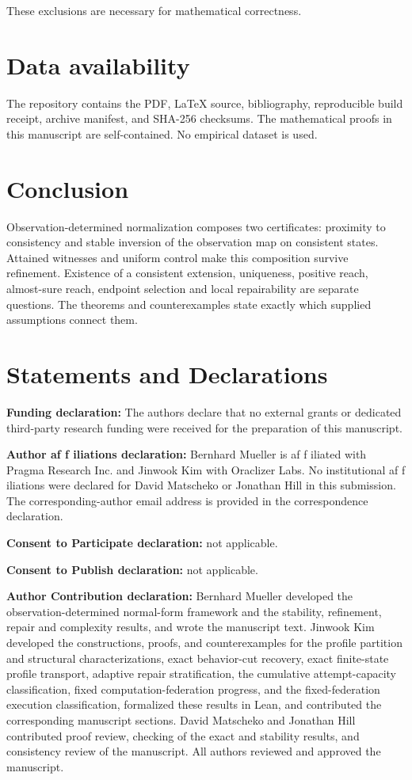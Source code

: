 \documentclass[11pt]{article}
\theoremstyle{definition}
\theoremstyle{remark}
\numberwithin{equation}{section}
\begin{document}
These exclusions are necessary for mathematical correctness.

\section{Data availability}\label{sec:availability}
The repository contains the PDF, LaTeX source, bibliography, reproducible build
receipt, archive manifest, and SHA-256 checksums. The mathematical proofs in
this manuscript are self-contained. No empirical dataset is used.

\section{Conclusion}

Observation-determined normalization composes two certificates: proximity
to consistency and stable inversion of the observation map on consistent
states. Attained witnesses and uniform control make this composition
survive refinement. Existence of a consistent extension, uniqueness,
positive reach, almost-sure reach, endpoint selection and local
repairability are separate questions. The theorems and counterexamples
state exactly which supplied assumptions connect them.

\section*{Statements and Declarations}

\noindent\textbf{Funding declaration:} The authors declare that no external grants or dedicated
third-party research funding were received for the preparation of this manuscript.

\noindent\textbf{Author af\kern0pt f\kern0pt iliations declaration:} Bernhard Mueller is af\kern0pt f\kern0pt iliated with
Pragma Research Inc. and Jinwook Kim with Oraclizer Labs. No institutional
af\kern0pt f\kern0pt iliations were declared for David Matscheko or
Jonathan Hill in this submission. The corresponding-author email address is provided in the
correspondence declaration.

\noindent\textbf{Consent to Participate declaration:} not applicable.

\noindent\textbf{Consent to Publish declaration:} not applicable.

\noindent\textbf{Author Contribution declaration:} Bernhard Mueller developed the
observation-determined normal-form framework and the stability, refinement, repair and complexity
results, and wrote the manuscript text. Jinwook Kim developed the constructions, proofs, and
counterexamples for the profile partition and structural characterizations, exact
behavior-cut recovery, exact finite-state profile transport, adaptive repair
stratification, the cumulative attempt-capacity classification, fixed
computation-federation progress, and the fixed-federation execution classification,
formalized these results in Lean, and contributed the corresponding manuscript
sections. David Matscheko and Jonathan Hill contributed
proof review, checking of the exact and stability results, and consistency
review of the manuscript. All authors reviewed and approved the manuscript.
\end{document}
